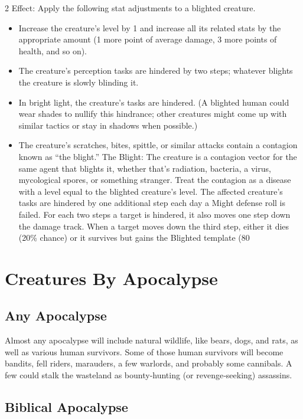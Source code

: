 \begin{multicols}{2}
Effect: Apply the following stat adjustments to a blighted creature.

\begin{itemize}
\item Increase the creature’s level by 1 and increase all its related stats by the appropriate amount (1 more point of average damage, 3 more points of health, and so on).
\item The creature’s perception tasks are hindered by two steps; whatever blights the creature is slowly blinding it.
\item In bright light, the creature’s tasks are hindered. (A blighted human could wear shades to nullify this hindrance; other creatures might come up with similar tactics or stay in shadows when possible.)
\item The creature’s scratches, bites, spittle, or similar attacks contain a contagion known as “the blight.” The Blight: The creature is a contagion vector for the same agent that blights it, whether that’s radiation, bacteria, a virus, mycological spores, or something stranger. Treat the contagion as a disease with a level equal to the blighted creature’s level. The affected creature’s tasks are hindered by one additional step each day a Might defense roll is failed. For each two steps a target is hindered, it also moves one step down the damage track. When a target moves down the third step, either it dies (20\% chance) or it survives but gains the Blighted template (80%
\end{itemize}

\section{Creatures By Apocalypse}

\subsection{Any Apocalypse}

Almost any apocalypse will include natural wildlife, like bears, dogs, and rats, as well as various human survivors. Some of those human survivors will become bandits, fell riders, marauders, a few warlords, and probably some cannibals. A few could stalk the wasteland as bounty‑hunting (or revenge‑seeking) assassins.

\subsection{Biblical Apocalypse}


\end{multicols}
